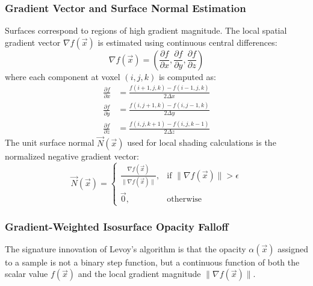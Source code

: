 \documentclass[10pt,twocolumn,a4paper]{article}
\begin{document}
\subsubsection{Gradient Vector and Surface Normal Estimation}
Surfaces correspond to regions of high gradient magnitude. The local spatial gradient vector $\nabla f(\vec{x})$ is estimated using continuous central differences:
\begin{equation}
\nabla f(\vec{x}) = \left( \frac{\partial f}{\partial x}, \frac{\partial f}{\partial y}, \frac{\partial f}{\partial z} \right)
\end{equation}
where each component at voxel $(i, j, k)$ is computed as:
\begin{align}
\frac{\partial f}{\partial x} &= \frac{f(i+1, j, k) - f(i-1, j, k)}{2 \Delta x} \\
\frac{\partial f}{\partial y} &= \frac{f(i, j+1, k) - f(i, j-1, k)}{2 \Delta y} \\
\frac{\partial f}{\partial z} &= \frac{f(i, j, k+1) - f(i, j, k-1)}{2 \Delta z}
\end{align}
The unit surface normal $\vec{N}(\vec{x})$ used for local shading calculations is the normalized negative gradient vector:
\begin{equation}
\vec{N}(\vec{x}) = \begin{cases}
\frac{\nabla f(\vec{x})}{\|\nabla f(\vec{x})\|}, & \text{if } \|\nabla f(\vec{x})\| > \epsilon \\
\vec{0}, & \text{otherwise}
\end{cases}
\end{equation}

\subsubsection{Gradient-Weighted Isosurface Opacity Falloff}
The signature innovation of Levoy's algorithm is that the opacity $\alpha(\vec{x})$ assigned to a sample is not a binary step function, but a continuous function of both the scalar value $f(\vec{x})$ and the local gradient magnitude $\|\nabla f(\vec{x})\|$. 
\end{document}
